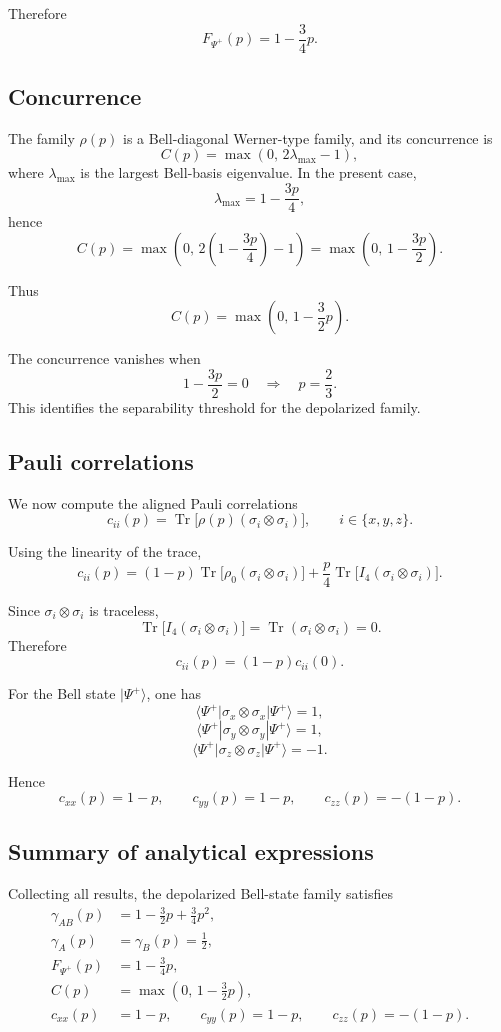 \documentclass[a4paper]{article}
\begin{document}
Therefore
\[
F_{\Psi^+}(p)=1-\frac{3}{4}p.
\]

\subsection*{Concurrence}

The family \(\rho(p)\) is a Bell-diagonal Werner-type family, and its concurrence is
\[
C(p)=\max\left(0,\,2\lambda_{\max}-1\right),
\]
where \(\lambda_{\max}\) is the largest Bell-basis eigenvalue. In the present case,
\[
\lambda_{\max}=1-\frac{3p}{4},
\]
hence
\[
C(p)
=
\max\left(0,\,2\left(1-\frac{3p}{4}\right)-1\right)
=
\max\left(0,\,1-\frac{3p}{2}\right).
\]

Thus
\[
C(p)=\max\left(0,\,1-\frac{3}{2}p\right).
\]

The concurrence vanishes when
\[
1-\frac{3p}{2}=0
\quad\Longrightarrow\quad
p=\frac{2}{3}.
\]
This identifies the separability threshold for the depolarized family.

\subsection*{Pauli correlations}

We now compute the aligned Pauli correlations
\[
c_{ii}(p)=\operatorname{Tr}\bigl[\rho(p)(\sigma_i\otimes\sigma_i)\bigr],
\qquad i\in\{x,y,z\}.
\]

Using the linearity of the trace,
\[
c_{ii}(p)
=
(1-p)\operatorname{Tr}\bigl[\rho_0(\sigma_i\otimes\sigma_i)\bigr]
+
\frac p4 \operatorname{Tr}\bigl[I_4(\sigma_i\otimes\sigma_i)\bigr].
\]

Since \(\sigma_i\otimes\sigma_i\) is traceless,
\[
\operatorname{Tr}\bigl[I_4(\sigma_i\otimes\sigma_i)\bigr]
=
\operatorname{Tr}(\sigma_i\otimes\sigma_i)=0.
\]
Therefore
\[
c_{ii}(p)=(1-p)c_{ii}(0).
\]

For the Bell state \(|\Psi^+\rangle\), one has
\[
\langle\Psi^+|\sigma_x\otimes\sigma_x|\Psi^+\rangle = 1,
\]
\[
\langle\Psi^+|\sigma_y\otimes\sigma_y|\Psi^+\rangle = 1,
\]
\[
\langle\Psi^+|\sigma_z\otimes\sigma_z|\Psi^+\rangle = -1.
\]

Hence
\[
c_{xx}(p)=1-p,
\qquad
c_{yy}(p)=1-p,
\qquad
c_{zz}(p)=-(1-p).
\]


\subsection*{Summary of analytical expressions}

Collecting all results, the depolarized Bell-state family satisfies
\[
\boxed{
\begin{aligned}
\gamma_{AB}(p) &= 1-\frac{3}{2}p+\frac{3}{4}p^2, \\
\gamma_A(p) &= \gamma_B(p)=\frac12, \\
F_{\Psi^+}(p) &= 1-\frac34 p, \\
C(p) &= \max\left(0,\,1-\frac32 p\right), \\
c_{xx}(p) &= 1-p,\qquad c_{yy}(p)=1-p,\qquad c_{zz}(p)=-(1-p).
\end{aligned}
}
\]
\end{document}
